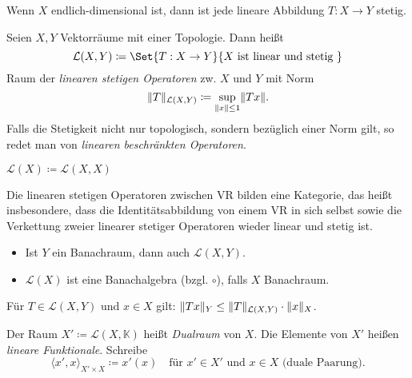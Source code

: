 \documentclass{cheat-sheet}
\newcommand{\K}{\mathbb{K}}
\newcommand{\LSO}{\mathcal{L}} %
\begin{document}
\begin{bem}
  Wenn $X$ endlich-dimensional ist, dann ist jede lineare Abbildung $T : X \to Y$ stetig.
\end{bem}

\begin{defn}
  Seien $X, Y$ Vektorräume mit einer Topologie. Dann heißt
  \[ \LSO(X, Y) \coloneqq \Set{ T : X \to Y }{ X \text{ ist linear und stetig } } \]
  Raum der \emph{linearen stetigen Operatoren} zw. $X$ und $Y$ mit Norm
  \[ \norm{T}_{\LSO(X, Y)} \coloneqq \sup_{\norm{x} \leq 1} \norm{Tx}. \]
  Falls die Stetigkeit nicht nur topologisch, sondern bezüglich einer Norm gilt, so redet man von \emph{linearen beschränkten Operatoren}.
\end{defn}

\begin{nota}
  $\LSO(X) \coloneqq \LSO(X, X)$
\end{nota}

\begin{bem}
  Die linearen stetigen Operatoren zwischen VR bilden eine Kategorie, das heißt insbesondere, dass die Identitätsabbildung von einem VR in sich selbst sowie die Verkettung zweier linearer stetiger Operatoren wieder linear und stetig ist.
\end{bem}

\begin{satz}
  \begin{itemize}
    \item Ist $Y$ ein Banachraum, dann auch $\LSO(X, Y)$.
    \item $\LSO(X)$ ist eine Banachalgebra (bzgl. $\circ$), falls $X$ Banachraum.
  \end{itemize}
\end{satz}

\begin{satz}
  Für $T \in \LSO(X, Y)$ und $x \in X$ gilt: $\norm{Tx}_Y \leq \norm{T}_{\LSO(X, Y)} \cdot \norm{x}_X$.
\end{satz}


\begin{defn}
  Der Raum $X' \coloneqq \LSO(X, \K)$ heißt \emph{Dualraum} von $X$. Die Elemente von $X'$ heißen \emph{lineare Funktionale}. Schreibe
  \[ \langle x', x \rangle_{X' {\times} X} \coloneqq x'(x) \quad \text{für $x' \in X'$ und $x \in X$ (duale Paarung)}. \]
\end{defn}
\end{document}
